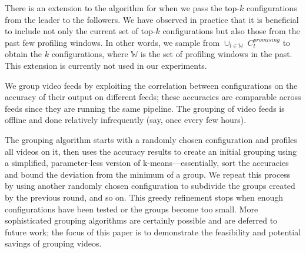 There is an extension to the algorithm for when we pass the top-$k$ configurations from the leader to the followers. We have observed in practice that it is beneficial to include not only the current set of top-$k$ configurations but also those from the past few profiling windows. In other words, we sample from $\cup_{l\in \mathbb{W}}~C_l^{promising}$ to obtain the $k$ configurations, where $\mathbb{W}$ is the set of profiling windows in the past. This extension is currently not used in our experiments.


We group video feeds by exploiting the correlation between configurations on the accuracy of their output on different feeds; these accuracies are comparable across feeds since they are running the same pipeline. The grouping of video feeds is offline and done relatively infrequently (say, once every few hours).

The grouping algorithm starts with a randomly chosen configuration and profiles all videos on it, then uses the accuracy results to create an initial grouping using a simplified, parameter-less version of k-means---essentially, sort the accuracies and bound the deviation from the minimum of a group. We repeat this process by using another randomly chosen configuration to subdivide the groups created by the previous round, and so on. This greedy refinement stops when enough configurations have been tested or the groups become too small. More sophisticated grouping algorithms are certainly possible and are deferred to future work; the focus of this paper is to demonstrate the feasibility and potential savings of grouping videos.

